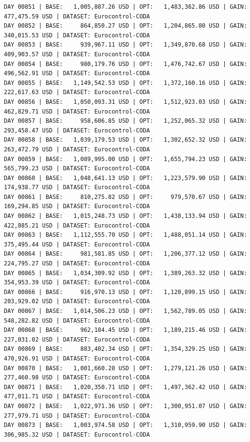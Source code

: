 \documentclass[11pt,a4paper]{article}
\begin{document}
\begin{verbatim}
DAY 00851 | BASE:   1,005,887.26 USD | OPT:   1,483,362.86 USD | GAIN: 477,475.59 USD | DATASET: Eurocontrol-CODA
DAY 00852 | BASE:     864,850.27 USD | OPT:   1,204,865.80 USD | GAIN: 340,015.53 USD | DATASET: Eurocontrol-CODA
DAY 00853 | BASE:     939,967.11 USD | OPT:   1,349,870.68 USD | GAIN: 409,903.57 USD | DATASET: Eurocontrol-CODA
DAY 00854 | BASE:     980,179.76 USD | OPT:   1,476,742.67 USD | GAIN: 496,562.91 USD | DATASET: Eurocontrol-CODA
DAY 00855 | BASE:   1,149,542.53 USD | OPT:   1,372,160.16 USD | GAIN: 222,617.63 USD | DATASET: Eurocontrol-CODA
DAY 00856 | BASE:   1,050,093.31 USD | OPT:   1,512,923.03 USD | GAIN: 462,829.71 USD | DATASET: Eurocontrol-CODA
DAY 00857 | BASE:     958,606.85 USD | OPT:   1,252,065.32 USD | GAIN: 293,458.47 USD | DATASET: Eurocontrol-CODA
DAY 00858 | BASE:   1,039,179.53 USD | OPT:   1,302,652.32 USD | GAIN: 263,472.79 USD | DATASET: Eurocontrol-CODA
DAY 00859 | BASE:   1,089,995.00 USD | OPT:   1,655,794.23 USD | GAIN: 565,799.23 USD | DATASET: Eurocontrol-CODA
DAY 00860 | BASE:   1,048,641.13 USD | OPT:   1,223,579.90 USD | GAIN: 174,938.77 USD | DATASET: Eurocontrol-CODA
DAY 00861 | BASE:     810,275.82 USD | OPT:     979,570.67 USD | GAIN: 169,294.85 USD | DATASET: Eurocontrol-CODA
DAY 00862 | BASE:   1,015,248.73 USD | OPT:   1,438,133.94 USD | GAIN: 422,885.21 USD | DATASET: Eurocontrol-CODA
DAY 00863 | BASE:   1,112,555.70 USD | OPT:   1,488,051.14 USD | GAIN: 375,495.44 USD | DATASET: Eurocontrol-CODA
DAY 00864 | BASE:     981,581.85 USD | OPT:   1,206,377.12 USD | GAIN: 224,795.27 USD | DATASET: Eurocontrol-CODA
DAY 00865 | BASE:   1,034,309.92 USD | OPT:   1,389,263.32 USD | GAIN: 354,953.39 USD | DATASET: Eurocontrol-CODA
DAY 00866 | BASE:     916,970.13 USD | OPT:   1,120,899.15 USD | GAIN: 203,929.02 USD | DATASET: Eurocontrol-CODA
DAY 00867 | BASE:   1,014,506.23 USD | OPT:   1,562,789.05 USD | GAIN: 548,282.82 USD | DATASET: Eurocontrol-CODA
DAY 00868 | BASE:     962,184.45 USD | OPT:   1,189,215.46 USD | GAIN: 227,031.02 USD | DATASET: Eurocontrol-CODA
DAY 00869 | BASE:     883,402.34 USD | OPT:   1,354,329.25 USD | GAIN: 470,926.91 USD | DATASET: Eurocontrol-CODA
DAY 00870 | BASE:   1,001,660.28 USD | OPT:   1,279,121.26 USD | GAIN: 277,460.98 USD | DATASET: Eurocontrol-CODA
DAY 00871 | BASE:   1,020,350.71 USD | OPT:   1,497,362.42 USD | GAIN: 477,011.71 USD | DATASET: Eurocontrol-CODA
DAY 00872 | BASE:   1,022,971.36 USD | OPT:   1,300,951.07 USD | GAIN: 277,979.71 USD | DATASET: Eurocontrol-CODA
DAY 00873 | BASE:   1,003,974.58 USD | OPT:   1,310,959.90 USD | GAIN: 306,985.32 USD | DATASET: Eurocontrol-CODA

\end{verbatim}
\end{document}
